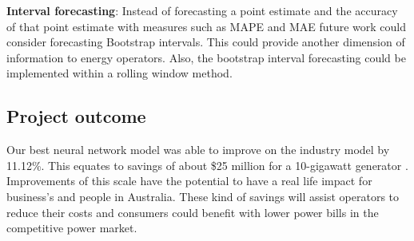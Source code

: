 \documentclass[11pt]{article}
\begin{document}
\noindent \textbf{Interval forecasting}: Instead of forecasting a point estimate and the accuracy of that point estimate with measures such as MAPE and MAE future work could consider forecasting Bootstrap intervals. This could provide another dimension of information to energy operators. Also, the bootstrap interval forecasting could be implemented within a rolling window method.

\subsection{Project outcome}

Our best neural network model was able to improve on the industry model by 11.12\%. This equates to savings of about \$25 million for a 10-gigawatt generator \citep{hobbs_analysis_1999}. Improvements of this scale have the potential to have a real life impact for business's and people in Australia. These kind of savings will assist operators to reduce their costs and consumers could benefit with lower power bills in the competitive power market. 

\newpage
 
\renewcommand{\bibname}{References}


\newpage






\end{document}
